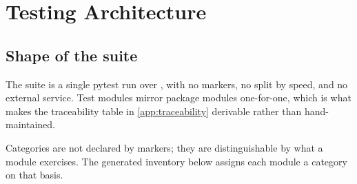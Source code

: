 
\chapter{Testing Architecture}
\label{ch:testing}

\section{Shape of the suite}

The suite is a single pytest run over , with no markers, no
split by speed, and no external service. Test modules mirror package modules
one-for-one, which is what makes the traceability table in
\cref{app:traceability} derivable rather than hand-maintained.

Categories are not declared by markers; they are distinguishable by what a
module exercises. The generated inventory below assigns each module a category
on that basis.

